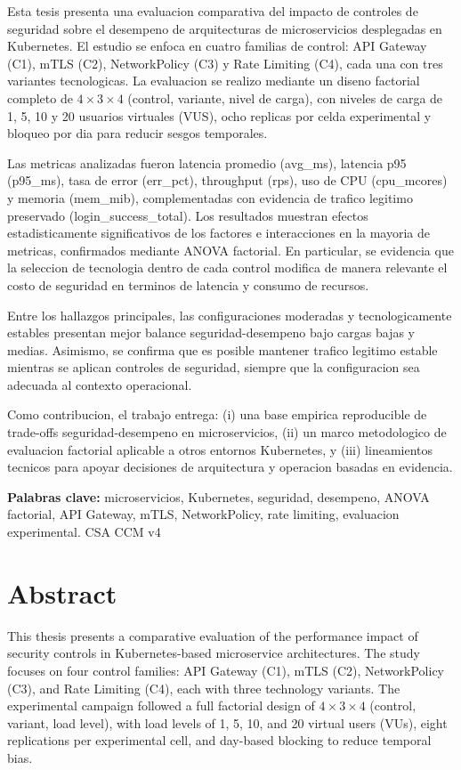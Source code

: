 \documentclass[12pt,letterpaper,fleqn]{report}
\begin{document}
Esta tesis presenta una evaluacion comparativa del impacto de controles de seguridad sobre el desempeno de arquitecturas de microservicios desplegadas en Kubernetes. El estudio se enfoca en cuatro familias de control: API Gateway (C1), mTLS (C2), NetworkPolicy (C3) y Rate Limiting (C4), cada una con tres variantes tecnologicas. La evaluacion se realizo mediante un diseno factorial completo de $4 \times 3 \times 4$ (control, variante, nivel de carga), con niveles de carga de 1, 5, 10 y 20 usuarios virtuales (VUS), ocho replicas por celda experimental y bloqueo por dia para reducir sesgos temporales.

Las metricas analizadas fueron latencia promedio (avg\_ms), latencia p95 (p95\_ms), tasa de error (err\_pct), throughput (rps), uso de CPU (cpu\_mcores) y memoria (mem\_mib), complementadas con evidencia de trafico legitimo preservado (login\_success\_total). Los resultados muestran efectos estadisticamente significativos de los factores e interacciones en la mayoria de metricas, confirmados mediante ANOVA factorial. En particular, se evidencia que la seleccion de tecnologia dentro de cada control modifica de manera relevante el costo de seguridad en terminos de latencia y consumo de recursos.

Entre los hallazgos principales, las configuraciones moderadas y tecnologicamente estables presentan mejor balance seguridad-desempeno bajo cargas bajas y medias. Asimismo, se confirma que es posible mantener trafico legitimo estable mientras se aplican controles de seguridad, siempre que la configuracion sea adecuada al contexto operacional.

Como contribucion, el trabajo entrega: (i) una base empirica reproducible de trade-offs seguridad-desempeno en microservicios, (ii) un marco metodologico de evaluacion factorial aplicable a otros entornos Kubernetes, y (iii) lineamientos tecnicos para apoyar decisiones de arquitectura y operacion basadas en evidencia.

\textbf{Palabras clave:} microservicios, Kubernetes, seguridad, desempeno, ANOVA factorial, API Gateway, mTLS, NetworkPolicy, rate limiting, evaluacion experimental. CSA CCM v4


\chapter*{Abstract}

This thesis presents a comparative evaluation of the performance impact of security controls in Kubernetes-based microservice architectures. The study focuses on four control families: API Gateway (C1), mTLS (C2), NetworkPolicy (C3), and Rate Limiting (C4), each with three technology variants. The experimental campaign followed a full factorial design of $4 \times 3 \times 4$ (control, variant, load level), with load levels of 1, 5, 10, and 20 virtual users (VUs), eight replications per experimental cell, and day-based blocking to reduce temporal bias.
\end{document}
